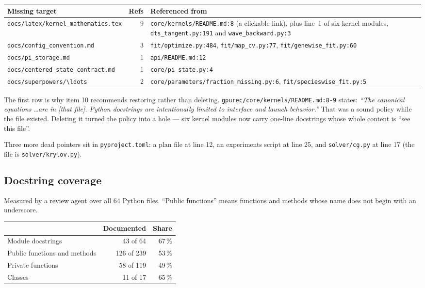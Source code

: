 \documentclass[11pt]{article}
\newcommand{\loc}[1]{\nolinkurl{#1}}
\newcommand{\dir}[1]{\nolinkurl{#1}}
\begin{document}
\begin{center}
\begin{tabular}{@{}p{}rp{}@{}}
\toprule
Missing target & Refs & Referenced from \\
\midrule
\dir{docs/latex/kernel\_mathematics.tex} & 9
  & \loc{core/kernels/README.md:8} (a clickable link), plus line~1 of six kernel
    modules, \loc{dts\_tangent.py:191} and \loc{wave\_backward.py:3} \\
\dir{docs/config\_convention.md} & 3
  & \loc{fit/optimize.py:484}, \loc{fit/map\_cv.py:77}, \loc{fit/genewise\_fit.py:60} \\
\dir{docs/pi\_storage.md} & 1 & \loc{api/README.md:12} \\
\dir{docs/centered\_state\_contract.md} & 1 & \loc{core/pi\_state.py:4} \\
\dir{docs/superpowers/\ldots} & 2
  & \loc{core/parameters/fraction\_missing.py:6}, \loc{fit/specieswise\_fit.py:5} \\
\bottomrule
\end{tabular}
\end{center}

The first row is why item 10 recommends restoring rather than deleting.
\loc{gpurec/core/kernels/README.md:8-9} states: \emph{``The canonical equations
\ldots are in [that file].  Python docstrings are intentionally limited to
interface and launch behavior.''}  That was a sound policy while the file
existed.  Deleting it turned the policy into a hole --- six kernel modules now
carry one-line docstrings whose whole content is ``see this file''.

Three more dead pointers sit in \dir{pyproject.toml}: a plan file at line 12, an
experiments script at line 25, and \dir{solver/cg.py} at line 17 (the file is
\dir{solver/krylov.py}).

\subsection{Docstring coverage}

Measured by a review agent over all 64 Python files.  ``Public functions'' means
functions and methods whose name does not begin with an underscore.

\begin{center}
\begin{tabular}{@{}lrr@{}}
\toprule
& Documented & Share \\
\midrule
Module docstrings            & 43 of 64   & 67\,\% \\
Public functions and methods & 126 of 239 & 53\,\% \\
Private functions            & 58 of 119  & 49\,\% \\
Classes                      & 11 of 17   & 65\,\% \\
\bottomrule
\end{tabular}
\end{center}
\end{document}
